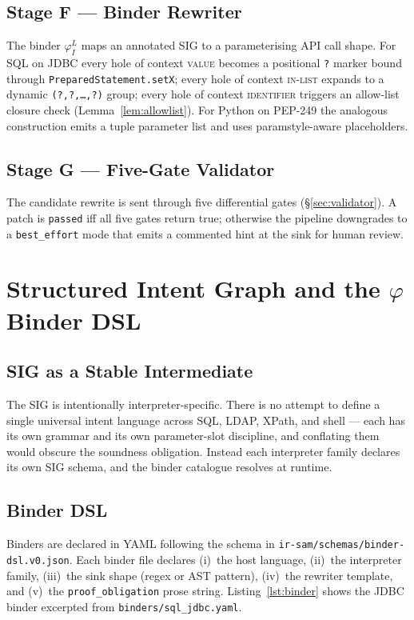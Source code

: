 \documentclass[conference]{IEEEtran}
\newcommand{\sig}{\textsc{SIG}}
\newcommand{\phisig}{\ensuremath{\varphi}}
\begin{document}
\subsection{Stage F --- Binder Rewriter}\label{ssec:rewriter}
The binder $\phisig^L_I$ maps an annotated \sig{} to a
parameterising API call shape. For SQL on JDBC every hole of context
\textsc{value} becomes a positional \texttt{?} marker bound through
\texttt{PreparedStatement.setX}; every hole of context
\textsc{in-list} expands to a dynamic
\texttt{(?,?,\dots,?)} group; every hole of context
\textsc{identifier} triggers an allow-list closure check
(Lemma~\ref{lem:allowlist}). For Python on PEP-249 the analogous
construction emits a tuple parameter list and uses paramstyle-aware
placeholders.

\subsection{Stage G --- Five-Gate Validator}
The candidate rewrite is sent through five differential gates
(\S\ref{sec:validator}). A patch is \texttt{passed} iff all five
gates return \textsf{true}; otherwise the pipeline downgrades to a
\texttt{best\_effort} mode that emits a commented hint at the sink
for human review.

\section{Structured Intent Graph and the \texorpdfstring{$\phisig$}{phi} Binder DSL}\label{sec:phi}

\subsection{\sig{} as a Stable Intermediate}
The \sig{} is intentionally interpreter-specific. There is no
attempt to define a single universal intent language across SQL,
LDAP, XPath, and shell --- each has its own grammar and its own
parameter-slot discipline, and conflating them would obscure the
soundness obligation. Instead each interpreter family declares its
own \sig{} schema, and the binder catalogue resolves at runtime.

\subsection{Binder DSL}\label{ssec:dsl}
Binders are declared in YAML following the schema in
\texttt{ir-sam/schemas/binder-dsl.v0.json}. Each binder file
declares (i)~the host language, (ii)~the interpreter family,
(iii)~the sink shape (regex or AST pattern), (iv)~the rewriter
template, and (v)~the \texttt{proof\_obligation} prose string.
Listing~\ref{lst:binder} shows the JDBC binder excerpted from
\texttt{binders/sql\_jdbc.yaml}.
\end{document}
